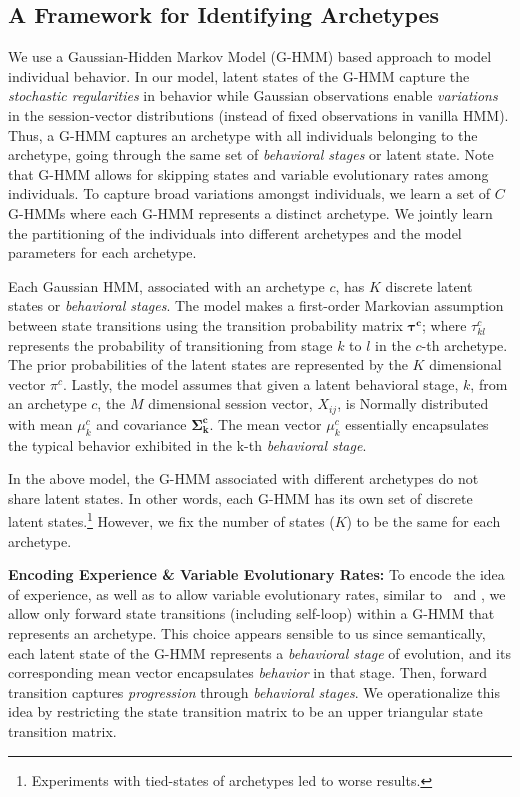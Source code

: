 \subsection{A Framework for Identifying Archetypes}
\label{subsec:GHMMCluster}
We use a Gaussian-Hidden Markov Model (G-HMM) based approach to model individual behavior.
In our model, latent states of the G-HMM capture the \emph{stochastic regularities} in behavior while Gaussian observations enable \emph{variations} in the session-vector distributions (instead of fixed observations in vanilla HMM). Thus, a G-HMM captures an archetype with all individuals belonging to the archetype, going through the same set of \emph{behavioral stages} or latent state. Note that G-HMM allows for skipping states and variable evolutionary rates among individuals.
To capture broad variations amongst individuals, we learn a set of  $C$ G-HMMs where each G-HMM represents a distinct archetype. We jointly learn the partitioning of the individuals into different archetypes and the model parameters for each archetype.

Each Gaussian HMM, associated with an archetype $c$, has $K$ discrete latent states or \emph{behavioral stages}. The model makes a first-order Markovian assumption between state transitions using the transition probability matrix $\mathbf{{\tau}^{c}}$; where $\tau_{kl}^{c}$ represents the probability of transitioning from stage $k$ to $l$ in the $c$-th archetype. The prior probabilities of the latent states are represented by the $K$ dimensional vector $\pi^{c}$. Lastly, the model assumes that given a latent behavioral stage, $k$, from an archetype $c$, the $M$ dimensional session vector, $X_{ij}$, is Normally distributed with mean $\mu_{k}^{c}$ and covariance $\mathbf{{\Sigma}_k^{c}}$. The mean vector $\mu_{k}^{c}$ essentially encapsulates the typical behavior exhibited in the k-th \emph{behavioral stage}.

In the above model, the G-HMM associated with different archetypes do not share latent states. In other words, each G-HMM has its own set of discrete latent states.\footnote{ Experiments with tied-states of archetypes led to worse results.} However, we fix the number of states ($K$) to be the same for each archetype.

\textbf{Encoding Experience \& Variable Evolutionary Rates: }
To encode the idea of experience, as well as to allow variable evolutionary rates, similar to~\cite{Yang:2014} and \citep{Knab2003}, we allow only forward state transitions (including self-loop) within a G-HMM that represents an archetype. This choice appears sensible to us since semantically, each latent state of the G-HMM represents a \emph{behavioral stage} of evolution, and its corresponding mean vector encapsulates \emph{behavior} in that stage. Then, forward transition captures \emph{progression} through \emph{behavioral stages}. We operationalize this idea by restricting the state transition matrix to be an upper triangular state transition matrix.

